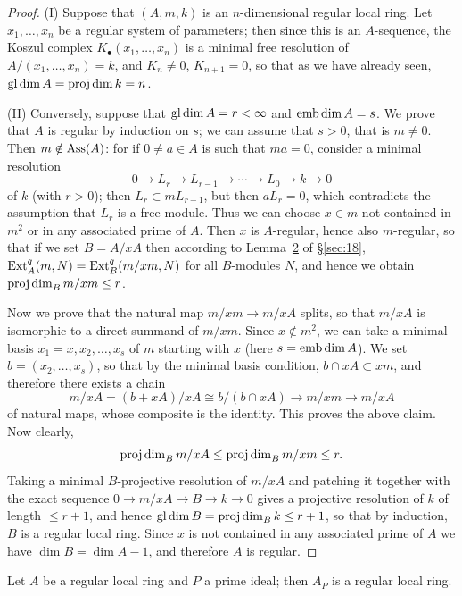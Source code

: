 \begin{proof}
(I) Suppose that $(A, m, k)$ is an $n$-dimensional regular local ring.
Let $x_1, \ldots, x_n$ be a regular system of parameters; then since this is an
$A$-sequence, the Koszul complex $K_\bullet(x_1, \ldots, x_n)$ is a minimal free resolution of
$A/(x_1, \ldots, x_n) = k$, and $K_n \neq 0$, $K_{n+1} = 0$, so that as we have already seen,
$\operatorname{gl\,dim} A = \operatorname{proj\,dim} k = n$.

(II) Conversely, suppose that $\operatorname{gl\,dim} A = r < \infty$ and $\operatorname{emb\,dim} A = s$. We
prove that $A$ is regular by induction on $s$; we can assume that $s > 0$, that
is $m \neq 0$. Then $m \notin \operatorname{Ass}(A)$: for if $0 \neq a \in A$ is such that $ma = 0$, consider
a minimal resolution
\[
  0 \to L_r \to L_{r-1} \to \cdots \to L_0 \to k \to 0
\]
of $k$ (with $r > 0$); then $L_r \subset mL_{r-1}$, but then $aL_r = 0$, which contradicts the
assumption that $L_r$ is a free module. Thus we can choose $x \in m$ not
contained in $m^2$ or in any associated prime of $A$. Then $x$ is $A$-regular,
hence also $m$-regular, so that if we set $B = A/xA$ then according to Lemma~\hyperref[lem:18.2]{2}
of \S\ref{sec:18}, $\operatorname{Ext}^q_A(m, N) = \operatorname{Ext}^q_B(m/xm, N)$ for all $B$-modules $N$, and hence
we obtain $\operatorname{proj\,dim}_B m/xm \le r$.

Now we prove that the natural map $m/xm \to m/xA$ splits, so that
$m/xA$ is isomorphic to a direct summand of $m/xm$. Since $x \notin m^2$, we can take
a minimal basis $x_1 = x, x_2, \ldots, x_s$ of $m$ starting with $x$ (here $s = \operatorname{emb\,dim}
A$). We set $b = (x_2, \ldots, x_s)$, so that by the minimal basis condition,
$b \cap xA \subset xm$, and therefore there exists a chain
\[
  m/xA = (b + xA)/xA \cong b/(b \cap xA) \to m/xm \to m/xA
\]
of natural maps, whose composite is the identity. This proves the above
claim. Now clearly,
\[
  \operatorname{proj\,dim}_B m/xA \le \operatorname{proj\,dim}_B m/xm \le r.
\]
Taking a minimal $B$-projective resolution of $m/xA$ and patching it together
with the exact sequence $0 \to m/xA \to B \to k \to 0$ gives a projective
resolution of $k$ of length $\le r + 1$, and hence $\operatorname{gl\,dim} B = \operatorname{proj\,dim}_B k \le r + 1$,
so that by induction, $B$ is a regular local ring. Since $x$ is not contained
in any associated prime of $A$ we have $\dim B = \dim A - 1$, and therefore
$A$ is regular.
\end{proof}

\begin{theorem}[Serre]\label{thm:19.3}
Let $A$ be a regular local ring and $P$ a prime ideal; then
$A_P$ is a regular local ring.
\end{theorem}

